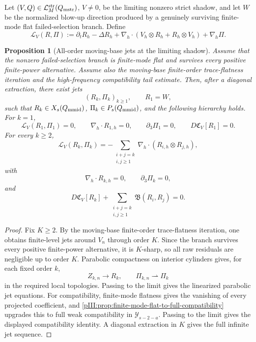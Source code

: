 \documentclass[11pt]{article}
\numberwithin{equation}{section}
\theoremstyle{plain}
\newtheorem{proposition}{Proposition}[section]
\theoremstyle{definition}
\theoremstyle{remark}
\newcommand{\nabh}{\nabla_h}
\newcommand{\Lstr}{\mathcal L^{\rm str}}
\newcommand{\calB}{\mathfrak B}
\newcommand{\calC}{\mathfrak C}
\newcommand{\calY}{\mathcal Y}
\begin{document}
Let \((V,Q)\in\Lstr_M(Q_{\rm mstr})\), \(V\neq0\), be the limiting nonzero strict shadow, and let
\(W\) be the normalized blow-up direction produced by a genuinely surviving finite-mode flat
failed-selection branch.  Define
\[
\mathscr L_V(R,\Pi)
:=
\partial_tR_h-\Delta R_h+
\nabh\cdot(V_h\otimes R_h+R_h\otimes V_h)+\nabh\Pi.
\]

\begin{proposition}[All-order moving-base jets at the limiting shadow]
\label{pIII:prop:all-order-moving-base-jets}
Assume that the nonzero failed-selection branch is finite-mode flat and survives every positive
finite-power alternative.  Assume also the moving-base finite-order trace-flatness iteration and the
high-frequency compatibility tail estimate.  Then, after a diagonal extraction, there exist jets
\[
        (R_k,\Pi_k)_{k\ge1},
        \qquad
        R_1=W,
\]
such that \(R_k\in X_s(Q_{\rm mmid})\), \(\Pi_k\in P_s(Q_{\rm mmid})\), and the following hierarchy
holds.  For \(k=1\),
\[
        \mathscr L_V(R_1,\Pi_1)=0,
        \qquad
        \nabh\cdot R_{1,h}=0,
        \qquad
        \partial_3\Pi_1=0,
        \qquad
        D\calC_V[R_1]=0.
\]
For every \(k\ge2\),
\[
        \mathscr L_V(R_k,\Pi_k)
        =
        -\sum_{\substack{i+j=k\\ i,j\ge1}}
        \nabh\cdot(R_{i,h}\otimes R_{j,h}),
\]
with
\[
        \nabh\cdot R_{k,h}=0,
        \qquad
        \partial_3\Pi_k=0,
\]
and
\[
        D\calC_V[R_k]+
        \sum_{\substack{i+j=k\\ i,j\ge1}}\calB(R_i,R_j)=0.
\]
\end{proposition}

\begin{proof}
Fix \(K\ge2\).  By the moving-base finite-order trace-flatness iteration, one obtains finite-level
jets around \(V_n\) through order \(K\).  Since the branch survives every positive finite-power
alternative, it is \(K\)-sharp, so all raw residuals are negligible up to order \(K\).  Parabolic
compactness on interior cylinders gives, for each fixed order \(k\),
\[
        Z_{k,n}\to R_k,
        \qquad
        \Pi_{k,n}\rightharpoonup \Pi_k
\]
in the required local topologies.  Passing to the limit gives the linearized parabolic jet equations.
For compatibility, finite-mode flatness gives the vanishing of every projected coefficient, and
\cref{pIII:prop:finite-mode-flat-to-full-compatibility} upgrades this to full weak compatibility in
\(\calY_{s-2-a}\).  Passing to the limit gives the displayed compatibility identity.  A diagonal
extraction in \(K\) gives the full infinite jet sequence.
\end{proof}
\end{document}
